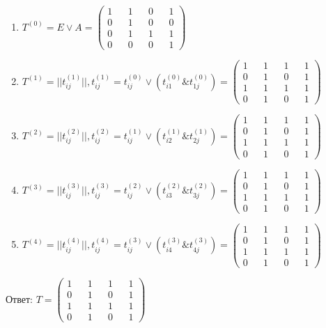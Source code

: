 \documentclass{article}
\begin{document}
\begin{enumerate}
	\begin{enumerate}
	\item
	$
	  	T^{(0)} = E \lor A =
		\begin{pmatrix}
		1 && 1 && 0 && 1 \\ 
		0 && 1 && 0 && 0 \\ 
		0 && 1 && 1 && 1 \\ 
		0 && 0 && 0 && 1 
		\end{pmatrix}
	$
	\item
	$
		T^{(1)} = ||t^{(1)}_{ij}||, t^{(1)}_{ij} = t^{(0)}_{ij} \lor (t^{(0)}_{i1} \& t^{(0)}_{1j}) =
	  	\begin{pmatrix}
		1 && 1 && 1 && 1 \\ 
		0 && 1 && 0 && 1 \\ 
		1 && 1 && 1 && 1 \\ 
		0 && 1 && 0 && 1
		\end{pmatrix}
	$
	\item
	$
	  	T^{(2)} = ||t^{(2)}_{ij}||, t^{(2)}_{ij} = t^{(1)}_{ij} \lor (t^{(1)}_{i2} \& t^{(1)}_{2j}) =
	  	\begin{pmatrix}
		1 && 1 && 1 && 1 \\ 
		0 && 1 && 0 && 1 \\ 
		1 && 1 && 1 && 1 \\ 
		0 && 1 && 0 && 1
		\end{pmatrix}
	$
	\item
	$
	  	T^{(3)} = ||t^{(3)}_{ij}||, t^{(3)}_{ij} = t^{(2)}_{ij} \lor (t^{(2)}_{i3} \& t^{(2)}_{3j}) =
	  	\begin{pmatrix}
		1 && 1 && 1 && 1 \\ 
		0 && 1 && 0 && 1 \\ 
		1 && 1 && 1 && 1 \\ 
		0 && 1 && 0 && 1
		\end{pmatrix}
	$
	\item
	$
	  	T^{(4)} = ||t^{(4)}_{ij}||, t^{(4)}_{ij} = t^{(3)}_{ij} \lor (t^{(3)}_{i4} \& t^{(3)}_{4j}) =
	  	\begin{pmatrix}
		1 && 1 && 1 && 1 \\ 
		0 && 1 && 0 && 1 \\ 
		1 && 1 && 1 && 1 \\ 
		0 && 1 && 0 && 1
		\end{pmatrix}
	$
	\end{enumerate}
\end{enumerate}
Ответ:
$
T = 
\begin{pmatrix}
1 && 1 && 1 && 1 \\ 
0 && 1 && 0 && 1 \\ 
1 && 1 && 1 && 1 \\ 
0 && 1 && 0 && 1
\end{pmatrix}
$
\end{document}
